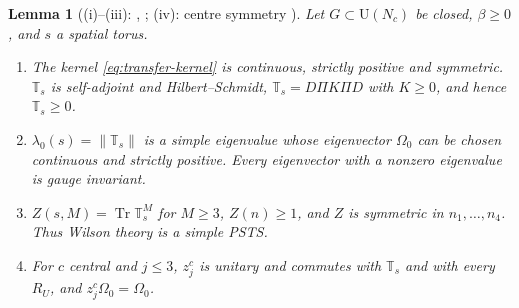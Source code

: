 \documentclass[11pt,a4paper]{amsart}
\newtheorem{lemma}[theorem]{Lemma}
\theoremstyle{definition}
\theoremstyle{remark}
\numberwithin{equation}{section}
\DeclareMathOperator{\Tr}{Tr}        %
\newcommand{\norm}[1]{\lVert #1\rVert}     %
\newcommand{\U}{\mathrm{U}}                %
\newcommand{\PSTS}{\textup{PSTS}}          %
\newcommand{\TT}{\mathbb{T}}               %
\newcommand{\Zpart}[2]{Z(#1,#2)}           %
\newcommand{\lzero}{\lambda_0}             %
\newcommand{\Omegazero}{\Omega_0}          %
\begin{document}
\begin{lemma}[{(i)--(iii): \cite[Lemma~11(i),(ii),(vii)]{bhattacharjee2026first}, \cite{osterwalder1978,luscher1977,creutz1977}; (iv): centre symmetry \cite{thooft1979}}]\label{lem:transfer-matrix}
Let $G\subset\U(N_c)$ be closed, $\beta\ge0$, and $s$ a spatial torus.
\begin{enumerate}[label=(\roman*)]
\item The kernel \eqref{eq:transfer-kernel} is continuous, strictly positive and symmetric. $\TT_s$ is self-adjoint and Hilbert--Schmidt, $\TT_s=D\Pi K\Pi D$ with $K\ge0$, and hence $\TT_s\ge0$.
\item $\lzero(s)=\norm{\TT_s}$ is a simple eigenvalue whose eigenvector $\Omegazero$ can be chosen continuous and strictly positive. Every eigenvector with a nonzero eigenvalue is gauge invariant.
\item $\Zpart{s}{M}=\Tr\TT_s^M$ for $M\ge3$, $Z(n)\ge1$, and $Z$ is symmetric in $n_1,\dots,n_4$. Thus Wilson theory is a simple \PSTS{}.
\item For $c$ central and $j\le3$, $z_j^c$ is unitary and commutes with $\TT_s$ and with every $R_U$, and $z_j^c\Omegazero=\Omegazero$.
\end{enumerate}
\end{lemma}
\end{document}
